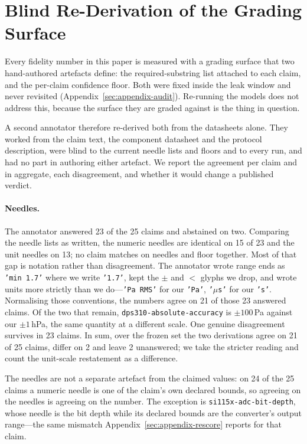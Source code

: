 \documentclass[11pt]{article}
\begin{document}
\section{Blind Re-Derivation of the Grading Surface}
\label{sec:appendix-rederivation}

Every fidelity number in this paper is measured with a grading surface
that two hand-authored artefacts define: the required-substring list
attached to each claim, and the per-claim confidence floor. Both were
fixed inside the leak window and never revisited
(Appendix~\ref{sec:appendix-audit}). Re-running the models does not
address this, because the surface they are graded against is the thing
in question.

A second annotator therefore re-derived both from the datasheets alone.
They worked from the claim text, the component datasheet and the
protocol description, were blind to the current needle lists and floors
and to every run, and had no part in authoring either artefact. We
report the agreement per claim and in aggregate, each disagreement, and
whether it would change a published verdict.

\paragraph{Needles.}
The annotator answered 23 of the 25 claims and abstained on two.
Comparing the needle lists as written, the numeric needles are identical
on 15 of 23 and the unit needles on 13; no claim matches on needles and
floor together. Most of that gap is notation rather than disagreement.
The annotator wrote range ends as \texttt{'min 1.7'} where we write
\texttt{'1.7'}, kept the $\pm$ and $<$ glyphs we drop, and wrote units
more strictly than we do---\texttt{'Pa RMS'} for our \texttt{'Pa'},
\texttt{'$\mu$s'} for our \texttt{'s'}. Normalising those conventions,
the numbers agree on 21 of those 23 answered claims. Of the two that
remain,
\texttt{dps310-absolute-accuracy} is $\pm100$\,Pa against our
$\pm1$\,hPa, the same quantity at a different scale. One genuine
disagreement survives in 23 claims. In sum, over the frozen set the two
derivations agree on 21 of 25 claims, differ on 2 and leave 2
unanswered; we take the stricter reading and count the unit-scale
restatement as a difference.

The needles are not a separate artefact from the claimed values: on 24
of the 25 claims a numeric needle is one of the claim's own declared
bounds, so agreeing on the needles is agreeing on the number. The
exception is \texttt{si115x-adc-bit-depth}, whose needle is the bit
depth while its declared bounds are the converter's output range---the
same mismatch Appendix~\ref{sec:appendix-rescore} reports for that
claim.
\end{document}
